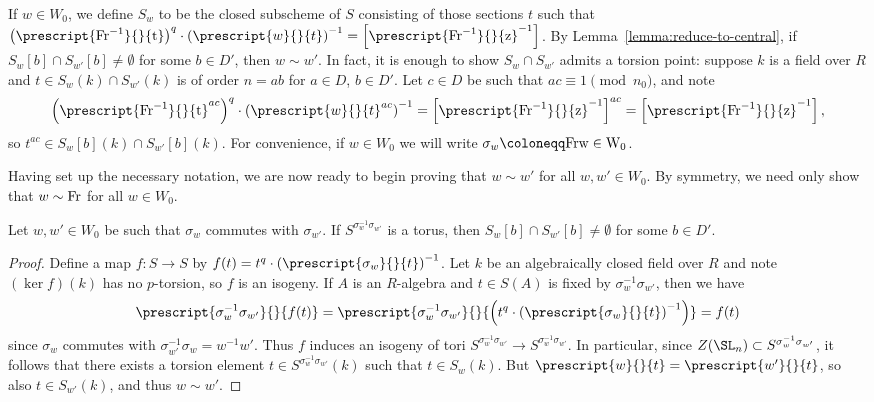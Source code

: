 If $w \in W_0$, we define $S_w$ to be the closed subscheme of $S$ consisting of those sections $t$ such that $\left(\prescript{\rm{Fr}^{-1}}{}{t}\right)^q \cdot \left(\prescript{w}{}{t}\right)^{-1} = \left[\prescript{\rm{Fr}^{-1}}{}{z}^{-1}\right]$. By Lemma~\ref{lemma:reduce-to-central}, if $S_w[b] \cap S_{w'}[b] \neq \emptyset$ for some $b \in D'$, then $w \sim w'$. In fact, it is enough to show $S_w \cap S_{w'}$ admits a torsion point: suppose $k$ is a field over $R$ and $t \in S_w(k) \cap S_{w'}(k)$ is of order $n = ab$ for $a \in D$, $b \in D'$. Let $c \in D$ be such that $ac \equiv 1 \pmod{n_0}$, and note
\[
\left(\prescript{\rm{Fr}^{-1}}{}{t}^{ac}\right)^q \cdot \left(\prescript{w}{}{t}^{ac}\right)^{-1} = \left[\prescript{\rm{Fr}^{-1}}{}{z}^{-1}\right]^{ac} = \left[\prescript{\rm{Fr}^{-1}}{}{z}^{-1}\right],
\]
so $t^{ac} \in S_w[b](k) \cap S_{w'}[b](k)$. For convenience, if $w \in W_0$ we will write $\sigma_w \coloneqq \rm{Fr}w \in W_0$. \smallskip

Having set up the necessary notation, we are now ready to begin proving that $w \sim w'$ for all $w, w' \in W_0$. By symmetry, we need only show that $w \sim \rm{Fr}$ for all $w \in W_0$.

\begin{lemma}\label{lemma:reduction-helper}
    Let $w, w' \in W_0$ be such that $\sigma_w$ commutes with $\sigma_{w'}$. If $S^{\sigma_w^{-1}\sigma_{w'}}$ is a torus, then $S_w[b] \cap S_{w'}[b] \neq \emptyset$ for some $b \in D'$.
\end{lemma}

\begin{proof}
    Define a map $f\colon S \to S$ by $f(t) = t^q \cdot \left(\prescript{\sigma_w}{}{t}\right)^{-1}$. Let $k$ be an algebraically closed field over $R$ and note $(\ker f)(k)$ has no $p$-torsion, so $f$ is an isogeny. If $A$ is an $R$-algebra and $t \in S(A)$ is fixed by $\sigma_w^{-1}\sigma_{w'}$, then we have
    \[
    \prescript{\sigma_w^{-1}\sigma_{w'}}{}{f(t)} = \prescript{\sigma_w^{-1}\sigma_{w'}}{}{\left(t^q \cdot \left(\prescript{\sigma_w}{}{t}\right)^{-1}\right)} = f(t)
    \]
    since $\sigma_w$ commutes with $\sigma_{w'}^{-1} \sigma_w = w^{-1}w'$. Thus $f$ induces an isogeny of tori $S^{\sigma_w^{-1}\sigma_{w'}} \to S^{\sigma_w^{-1}\sigma_{w'}}$. In particular, since $Z(\SL_n) \subset S^{\sigma_w^{-1}\sigma_{w'}}$, it follows that there exists a torsion element $t \in S^{\sigma_w^{-1}\sigma_{w'}}(k)$ such that $t \in S_w(k)$. But $\prescript{w}{}{t} = \prescript{w'}{}{t}$, so also $t \in S_{w'}(k)$, and thus $w \sim w'$.
\end{proof}

